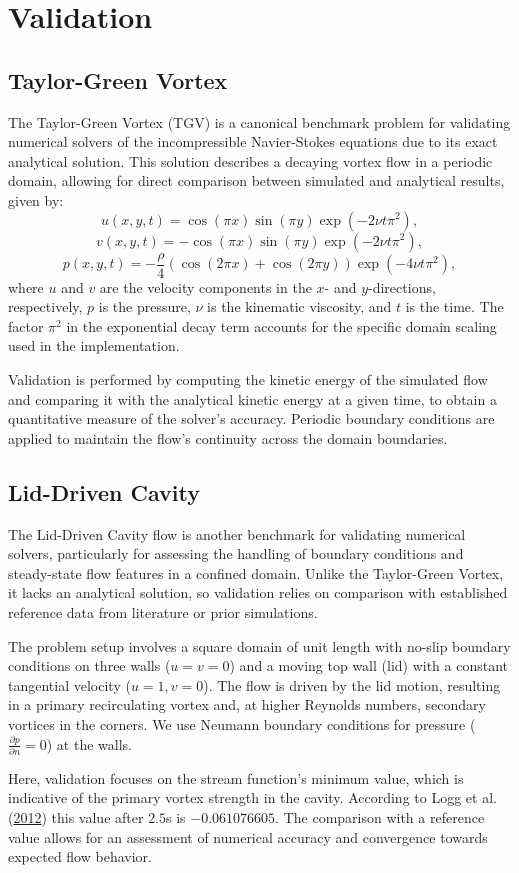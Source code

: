 \section{Validation}

\subsection{Taylor-Green Vortex}
The Taylor-Green Vortex (TGV) is a canonical benchmark problem for validating numerical solvers of the incompressible Navier-Stokes equations due to its exact analytical solution.
This solution describes a decaying vortex flow in a periodic domain, allowing for direct comparison between simulated and analytical results, given by:
\[
u(x, y, t) = \cos(\pi x) \sin(\pi y) \exp(-2 \nu t \pi^2),
\]
\[
v(x, y, t) = -\cos(\pi x) \sin(\pi y) \exp(-2 \nu t \pi^2),
\]
\[
p(x, y, t) = -\frac{\rho}{4} \left( \cos(2\pi x) + \cos(2\pi y) \right) \exp(-4 \nu t \pi^2),
\]
where \( u \) and \( v \) are the velocity components in the \( x \)- and \( y \)-directions, respectively, \( p \) is the pressure, \( \nu \) is the kinematic viscosity, and \( t \) is the time.
The factor \( \pi^2 \) in the exponential decay term accounts for the specific domain scaling used in the implementation.

Validation is performed by computing the kinetic energy of the simulated flow and comparing it with the analytical kinetic energy at a given time, to obtain a quantitative measure of the solver's accuracy.
Periodic boundary conditions are applied to maintain the flow's continuity across the domain boundaries.

\subsection{Lid-Driven Cavity}

The Lid-Driven Cavity flow is another benchmark for validating numerical solvers, particularly for assessing the handling of boundary conditions and steady-state flow features in a confined domain.
Unlike the Taylor-Green Vortex, it lacks an analytical solution, so validation relies on comparison with established reference data from literature or prior simulations.

The problem setup involves a square domain of unit length with no-slip boundary conditions on three walls (\( u = v = 0 \)) and a moving top wall (lid) with a constant tangential velocity (\( u = 1, v = 0 \)).
The flow is driven by the lid motion, resulting in a primary recirculating vortex and, at higher Reynolds numbers, secondary vortices in the corners.
We use Neumann boundary conditions for pressure (\( \frac{\partial p}{\partial n} = 0 \)) at the walls.

Here, validation focuses on the stream function's minimum value, which is indicative of the primary vortex strength in the cavity.
According to Logg et al. (\href{https://doi.org/10.1007/978-3-642-23099-8}{2012}) this value after $2.5$s is $-0.061076605$.
The comparison with a reference value allows for an assessment of numerical accuracy and convergence towards expected flow behavior.
